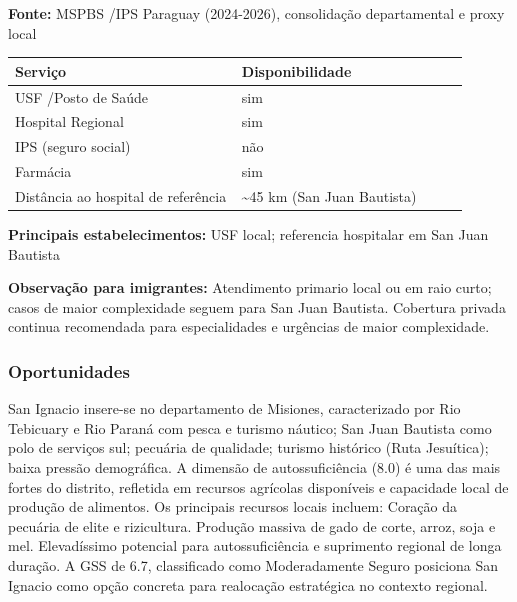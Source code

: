 \textbf{Fonte:} MSPBS /\allowbreak  IPS Paraguay (2024-2026), consolidação
departamental e proxy local

{\def\LTcaptype{none} %
\begin{longtable}{@{}>{\raggedright\arraybackslash}p{0.45\linewidth} >{\raggedright\arraybackslash}p{0.45\linewidth}@{}}
\toprule\noalign{}
Serviço & Disponibilidade \\
\midrule\noalign{}
\endhead
\bottomrule\noalign{}
\endlastfoot
USF /\allowbreak  Posto de Saúde & sim \\
Hospital Regional & sim \\
IPS (seguro social) & não \\
Farmácia & sim \\
Distância ao hospital de referência & \textasciitilde45 km (San Juan
Bautista) \\
\end{longtable}
}

\textbf{Principais estabelecimentos:} USF local; referencia hospitalar
em San Juan Bautista

\textbf{Observação para imigrantes:} Atendimento primario local ou em
raio curto; casos de maior complexidade seguem para San Juan Bautista.
Cobertura privada continua recomendada para especialidades e urgências
de maior complexidade.
\newpage

\subsubsection*{Oportunidades}\label{oport-san-ignacio-0803}
San Ignacio insere-se no departamento de Misiones, caracterizado por Rio Tebicuary e Rio Paraná com pesca e turismo náutico; San Juan Bautista como polo de serviços sul; pecuária de qualidade; turismo histórico (Ruta Jesuítica); baixa pressão demográfica. A dimensão de autossuficiência (8.0) é uma das mais fortes do distrito, refletida em recursos agrícolas disponíveis e capacidade local de produção de alimentos. Os principais recursos locais incluem: Coração da pecuária de elite e rizicultura. Produção massiva de gado de corte, arroz, soja e mel. Elevadíssimo potencial para autossuficiência e suprimento regional de longa duração. A GSS de 6.7, classificado como Moderadamente Seguro posiciona San Ignacio como opção concreta para realocação estratégica no contexto regional.

